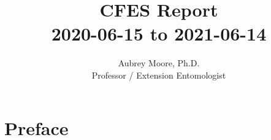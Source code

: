 



\usepackage[breaklinks=true, colorlinks=True, allcolors=blue]{hyperref}

\usepackage{indentfirst} 
\usepackage{comment}

\newcommand{\activities}{\medskip\textbf{Activities}}
\newcommand{\plans}{\medskip\textbf{Plans}}

\makeatletter

\makeatother






\title{CFES Report\\2020-06-15 to 2021-06-14}

\author{Aubrey Moore, Ph.D.\\
Professor / Extension Entomologist}

\maketitle

%
\setcounter{secnumdepth}{0} %
\setcounter{tocdepth}{2}
\tableofcontents{}

\clearpage


\section{Preface}
	
